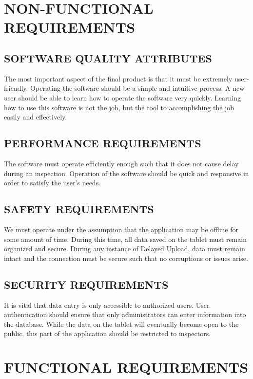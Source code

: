 \documentclass[twoside,letterpaper]{article}
\begin{document}
\clearpage\section[NON-FUNCTIONAL REQUIREMENTS]{\rmfamily\bfseries\color{black}
NON-FUNCTIONAL REQUIREMENTS}
{\rmfamily\color{black}

\subsection{SOFTWARE QUALITY ATTRIBUTES}
The most important aspect of the final product is that it must be extremely user-friendly. Operating the software should be a simple and intuitive process. A new user should be able to learn how to operate the software very quickly. Learning how to use this software is not the job, but the tool to accomplishing the job easily and effectively.

\subsection{PERFORMANCE REQUIREMENTS}
The software must operate efficiently enough such that it does not cause delay during an inspection. Operation of the software should be quick and responsive in order to satisfy the user's needs.

\subsection{SAFETY REQUIREMENTS}
We must operate under the assumption that the application may be offline for some amount of time. During this time, all data saved on the tablet must remain organized and secure. During any instance of Delayed Upload, data must remain intact and the connection must be secure such that no corruptions or issues arise.

\subsection{SECURITY REQUIREMENTS}
It is vital that data entry is only accessible to authorized users. User authentication should ensure that only administrators can enter information into the database. While the data on the tablet will eventually become open to the public, this part of the application should be restricted to inspectors.}

\clearpage\section[FUNCTIONAL REQUIREMENTS]{\rmfamily\bfseries\color{black}
FUNCTIONAL REQUIREMENTS}
\end{document}
